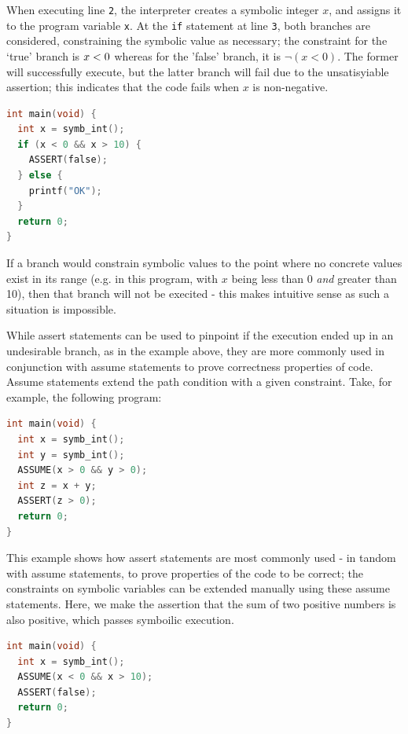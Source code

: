 When executing line \texttt{2}, the interpreter creates a symbolic integer $x$,
and assigns it to the program variable \texttt{x}. At the \texttt{if} statement
at line \texttt{3}, both branches are considered, constraining the symbolic
value as necessary; the constraint for the `true' branch is \texttt{$x < 0$}
whereas for the 'false' branch, it is \texttt{$\lnot (x < 0)$}. The former will
successfully execute, but the latter branch will fail due to the unsatisyiable
assertion; this indicates that the code fails when $x$ is non-negative.

\begin{lstlisting}[caption={Symbolic execution - non-executed branches}, style=code, language=C]
int main(void) {
  int x = symb_int();
  if (x < 0 && x > 10) {
    ASSERT(false);
  } else {
    printf("OK");
  }
  return 0;
}
\end{lstlisting}

If a branch would constrain symbolic values to the point where no concrete values exist in its range (e.g. in this program, with $x$ being less than 0 \textit{and} greater than 10), then that branch will not be execited - this makes intuitive sense as such a situation is impossible.

While assert statements can be used to pinpoint if the execution ended up in an undesirable branch, as in the example above, they are more commonly used in conjunction with assume statements to prove correctness properties of code. Assume statements extend the path condition with a given constraint. Take, for example, the following program:

\begin{lstlisting}[caption={Symbolic execution - assume and assert}, style=code, language=C]
int main(void) {
  int x = symb_int();
  int y = symb_int();
  ASSUME(x > 0 && y > 0);
  int z = x + y;
  ASSERT(z > 0);
  return 0;
}
\end{lstlisting}

This example shows how assert statements are most commonly used - in tandom with assume statements, to prove properties of the code to be correct; the constraints on symbolic variables can be extended manually using these assume statements. Here, we make the assertion that the sum of two positive numbers is also positive, which passes symboilic execution.

\begin{lstlisting}[caption={Symbolic execution - termination when unsatisfiable}, style=code, language=C]
int main(void) {
  int x = symb_int();
  ASSUME(x < 0 && x > 10);
  ASSERT(false);
  return 0;
}
\end{lstlisting}

